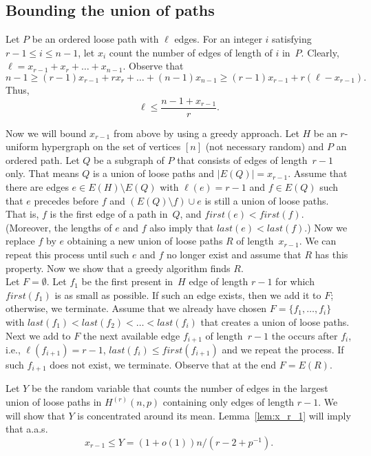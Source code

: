 \documentclass[12pt,reqno]{amsart}
\theoremstyle{remark}
\begin{document}
\subsection{Bounding the union of paths}
Let $P$ be an ordered loose path with $\ell$ edges.  For an integer $i$ satisfying $r-1\le i \le n-1$, let $x_i$ count the number of edges of length of $i$ in~$P$. Clearly, $\ell= x_{r-1} +x_r + \dots  + x_{n-1}$. Observe that
\[
n-1 \ge (r-1)x_{r-1}+rx_{r}+\dots+(n-1)x_{n-1} \ge (r-1)x_{r-1} + r(\ell-x_{r-1}).
\]
Thus,
\begin{equation}\label{ell_ub}
\ell \le \frac{n-1 + x_{r-1}}{r}.
\end{equation}

Now we will bound $x_{r-1}$ from above by using a greedy approach. Let $H$ be an $r$-uniform hypergraph on the set of vertices $[n]$ (not necessary random) and $P$ an ordered path.
Let $Q$ be a subgraph of $P$ that consists of edges of length~$r-1$ only. That means $Q$ is a union of loose paths and  $|E(Q)|=x_{r-1}$. Assume that there are edges $e\in E(H)\setminus E(Q)$ with $\ell(e)=r-1$ and $f\in E(Q)$ such that $e$ precedes before $f$
and $\left(E(Q)\setminus f\right) \cup e$ is still a union of loose paths. 
That is, $f$ is the first edge of a path in~$Q$, and $first(e)< first(f)$. (Moreover, the lengths of $e$ and $f$ also imply that $last(e)< last(f)$.) Now we replace $f$ by $e$ obtaining a new union of loose paths $R$ of length~$x_{r-1}$. We can repeat this process until such $e$ and $f$ no longer exist and assume that $R$ has this property. Now we show that a greedy algorithm finds $R$.\\

Let $F=\emptyset$. Let $f_1$ be the first present in~$H$ edge of length $r-1$ for which $first(f_1)$ is as small as possible. If such an edge exists, then we add it to $F$; otherwise, we terminate. Assume that we already have chosen $F=\{f_1,\dots,f_i\}$ with $last(f_1)<last(f_2)<\dots<last(f_i)$ that creates a union of loose paths. Next we add to $F$ the next available edge $f_{i+1}$ of length~$r-1$ the occurs after $f_i$, i.e., $\ell(f_{i+1})=r-1$, $last(f_i)\le first(f_{i+1})$ and we repeat the process. If such $f_{i+1}$ does not exist, we terminate. Observe that at the end $F = E(R)$.

Let $Y$ be the random variable that counts the number of edges in the largest union of loose paths in $H^{(r)}(n, p)$ containing only edges of length $r-1$. We will show that $Y$ is concentrated around its mean. Lemma~\ref{lem:x_r_1} will imply that a.a.s.\
\begin{equation}\label{xr1_ub}
x_{r-1} \le Y = (1+o(1))n/(r-2 + p^{-1}).
\end{equation}
\end{document}
